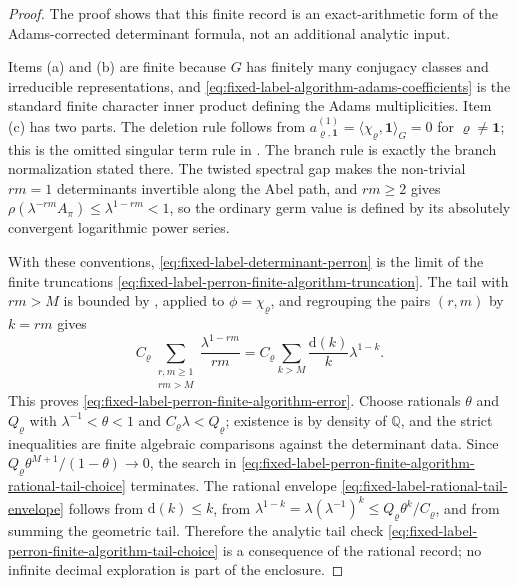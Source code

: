 \documentclass[11pt,a4paper]{amsart}
\theoremstyle{plain}
\theoremstyle{definition}
\theoremstyle{remark}
\newcommand{\QQ}{\mathbb{Q}}
\begin{document}
\begin{proof}
  The proof shows that this finite record is an exact-arithmetic form of the
  Adams-corrected determinant formula, not an additional analytic input.

  Items (a) and (b) are finite because \(G\) has finitely many conjugacy
  classes and irreducible representations, and
  \eqref{eq:fixed-label-algorithm-adams-coefficients} is the standard
  finite character inner product defining the Adams multiplicities.  Item
  (c) has two parts.  The deletion rule follows from
  \(a_{\varrho,\mathbf1}^{(1)}=\langle\chi_\varrho,\mathbf1\rangle_G=0\)
  for \(\varrho\neq\mathbf1\); this is the omitted singular term rule in
  .  The branch rule is exactly the
  branch normalization stated there.  The twisted spectral gap makes the
  non-trivial \(rm=1\) determinants invertible along the Abel path, and
  \(rm\ge2\) gives \(\rho(\lambda^{-rm}A_\pi)\le\lambda^{1-rm}<1\), so the
  ordinary germ value is defined by its absolutely convergent logarithmic
  power series.

  With these conventions, \eqref{eq:fixed-label-determinant-perron} is the
  limit of the finite truncations
  \eqref{eq:fixed-label-perron-finite-algorithm-truncation}.  The tail with
  \(rm>M\) is bounded by
  , applied to
  \(\phi=\chi_\varrho\), and regrouping the pairs \((r,m)\) by
  \(k=rm\) gives
  \[
    C_\varrho
    \sum_{\substack{r,m\ge1\\rm>M}}\frac{\lambda^{1-rm}}{rm}
    =
    C_\varrho\sum_{k>M}\frac{\mathrm d(k)}{k}\lambda^{1-k}.
  \]
  This proves \eqref{eq:fixed-label-perron-finite-algorithm-error}.  Choose
  rationals \(\theta\) and \(Q_\varrho\) with
  \(\lambda^{-1}<\theta<1\) and \(C_\varrho\lambda<Q_\varrho\); existence is by
  density of \(\QQ\), and the strict inequalities are finite algebraic
  comparisons against the determinant data.  Since
  \(Q_\varrho\theta^{M+1}/(1-\theta)\to0\), the search in
  \eqref{eq:fixed-label-perron-finite-algorithm-rational-tail-choice}
  terminates.  The rational envelope
  \eqref{eq:fixed-label-rational-tail-envelope} follows from
  \(\mathrm d(k)\le k\), from
  \(\lambda^{1-k}=\lambda(\lambda^{-1})^k\le Q_\varrho\theta^k/C_\varrho\),
  and from summing the geometric tail.  Therefore the analytic tail check
  \eqref{eq:fixed-label-perron-finite-algorithm-tail-choice} is a consequence
  of the rational record; no infinite decimal exploration is part of the
  enclosure.


\end{proof}
\end{document}
